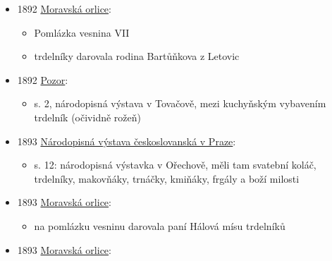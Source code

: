 \begin{itemize}
\begin{itemize}
    \begin{itemize}
    \tightlist
    \item
      popisuje městskou svatbu v Bzenci
    \item
      trvá celý týden
    \item
      ve čtvrtek se mládenci sejdou u družby a s družkami a hudbou jdou
      k prvnímu svatebnímu hostovi po cestě, kde dostanou koblihy,
      trdelníky, uzeniny a víno
    \end{itemize}
  \end{itemize}
\item
  1892
  \href{https://ceskadigitalniknihovna.cz/uuid/uuid:04f469ce-32f0-11de-992b-00145e5790ea}{Moravská
  orlice}:

  \begin{itemize}
  \tightlist
  \item
    Pomlázka vesnina VII
  \item
    trdelníky darovala rodina Bartůňkova z Letovic
  \end{itemize}
\item
  1892
  \href{https://www.digitalniknihovna.cz/vkol/uuid/uuid:db92b18a-5f60-46e9-a666-022fa9c0f4f6}{Pozor}:

  \begin{itemize}
  \tightlist
  \item
    s. 2, národopisná výstava v Tovačově, mezi kuchyňským vybavením
    trdelník (očividně rožeň)
  \end{itemize}
\item
  1893
  \href{https://ceskadigitalniknihovna.cz/uuid/uuid:765160d0-b6d7-11ea-b68c-005056827e52}{Národopisná
  výstava českoslovanská v Praze}:

  \begin{itemize}
  \tightlist
  \item
    s. 12: národopisná výstavka v Ořechově, měli tam svatební koláč,
    trdelníky, makovňáky, trnáčky, kmiňáky, frgály a boží milosti
  \end{itemize}
\item
  1893
  \href{https://ceskadigitalniknihovna.cz/view/uuid:04fd1c48-32f0-11de-992b-00145e5790ea?page=uuid:298ab776-32f0-11de-992b-00145e5790ea&fulltext=vaje\%C4\%8D*\%20trdel*&source=mzk}{Moravská
  orlice}:

  \begin{itemize}
  \tightlist
  \item
    na pomlázku vesninu darovala paní Hálová mísu trdelníků
  \end{itemize}
\item
  1893
  \href{https://ceskadigitalniknihovna.cz/uuid/uuid:299cdfa7-32f0-11de-992b-00145e5790ea}{Moravská
  orlice}:


\end{itemize}
